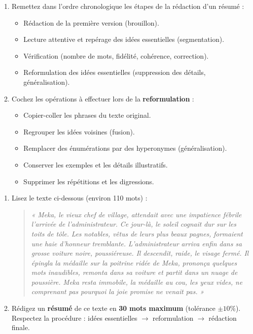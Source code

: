 \documentclass[11pt]{article}
\begin{document}
\begin{exercice}
\begin{enumerate}
    \item Remettez dans l'ordre chronologique les étapes de la rédaction d'un résumé :
    \begin{itemize}
        \item[--] Rédaction de la première version (brouillon).
        \item[--] Lecture attentive et repérage des idées essentielles (segmentation).
        \item[--] Vérification (nombre de mots, fidélité, cohérence, correction).
        \item[--] Reformulation des idées essentielles (suppression des détails, généralisation).
    \end{itemize}
    \item Cochez les opérations à effectuer lors de la \textbf{reformulation} :
    \begin{itemize}
        \item[$\square$] Copier-coller les phrases du texte original.
        \item[$\square$] Regrouper les idées voisines (fusion).
        \item[$\square$] Remplacer des énumérations par des hyperonymes (généralisation).
        \item[$\square$] Conserver les exemples et les détails illustratifs.
        \item[$\square$] Supprimer les répétitions et les digressions.
    \end{itemize}
\end{enumerate}
\end{exercice}

\begin{exercice}
\begin{enumerate}
    \item Lisez le texte ci-dessous (environ 110 mots) :
    \begin{quote}
    \textit{« Meka, le vieux chef de village, attendait avec une impatience fébrile l'arrivée de l'administrateur. Ce jour-là, le soleil cognait dur sur les toits de tôle. Les notables, vêtus de leurs plus beaux pagnes, formaient une haie d'honneur tremblante. L'administrateur arriva enfin dans sa grosse voiture noire, poussiéreuse. Il descendit, raide, le visage fermé. Il épingla la médaille sur la poitrine ridée de Meka, prononça quelques mots inaudibles, remonta dans sa voiture et partit dans un nuage de poussière. Meka resta immobile, la médaille au cou, les yeux vides, ne comprenant pas pourquoi la joie promise ne venait pas. »}
    \end{quote}
    \item Rédigez un \textbf{résumé} de ce texte en \textbf{30 mots maximum} (tolérance $\pm 10\%$). Respectez la procédure : idées essentielles $\to$ reformulation $\to$ rédaction finale.
\end{enumerate}
\end{exercice}
\end{document}
